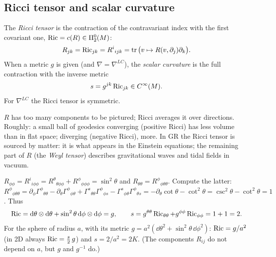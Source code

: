 \subsection{Ricci tensor and scalar curvature}
\begin{formal}
The \emph{Ricci tensor} is the contraction of the contravariant index with the first covariant one, $\operatorname{Ric}=c(R)\in\Pi^{0}_{2}(M)$:
\[
R_{jk}=\operatorname{Ric}_{jk}=R^i{}_{ijk}=\operatorname{tr}\big(v\mapsto R(v,\partial_j)\partial_k\big).
\]
When a metric $g$ is given (and $\nabla=\nabla^{LC}$), the \emph{scalar curvature} is the full contraction with the inverse metric
\[
s=g^{jk}\operatorname{Ric}_{jk}\in C^\infty(M).
\]
For $\nabla^{LC}$ the Ricci tensor is symmetric.
\end{formal}
\begin{intuition}[{Ricci = ``how volumes of small balls differ from flat ones''}]
$R$ has too many components to be pictured; Ricci averages it over directions. Roughly: a small ball of geodesics converging (positive Ricci) has less volume than in flat space; diverging (negative Ricci), more. In GR the Ricci tensor is sourced by matter: it is what appears in the Einstein equations; the remaining part of $R$ (the \emph{Weyl tensor}) describes gravitational waves and tidal fields in vacuum.
\end{intuition}

\begin{example}
$R_{\phi\phi}=R^i{}_{i\phi\phi}=R^\theta{}_{\theta\phi\phi}+R^\phi{}_{\phi\phi\phi}=\sin^2\theta$ and $R_{\theta\theta}=R^\phi{}_{\phi\theta\theta}$. Compute the latter: $R^\phi{}_{\phi\theta\theta}=\partial_\phi\Gamma^\phi{}_{\theta\theta}-\partial_\theta\Gamma^\phi{}_{\phi\theta}+\Gamma^s{}_{\theta\theta}\Gamma^\phi{}_{\phi s}-\Gamma^s{}_{\phi\theta}\Gamma^\phi{}_{\theta s}=-\partial_\theta\cot\theta-\cot^2\theta=\csc^2\theta-\cot^2\theta=1$. Thus
\[
\operatorname{Ric}=\mathrm{d}\theta\otimes\mathrm{d}\theta+\sin^2\theta\,\mathrm{d}\phi\otimes\mathrm{d}\phi=g,\qquad s=g^{\theta\theta}\operatorname{Ric}_{\theta\theta}+g^{\phi\phi}\operatorname{Ric}_{\phi\phi}=1+1=2 .
\]
For the sphere of radius $a$, with its metric $g=a^2(\dd\theta^2+\sin^2\theta\,\dd\phi^2)$: $\operatorname{Ric}=g/a^2$ (in 2D always $\operatorname{Ric}=\tfrac s2\,g$) and $s=2/a^2=2K$. (The components $R_{ij}$ do not depend on $a$, but $g$ and $g^{-1}$ do.)
\end{example}
